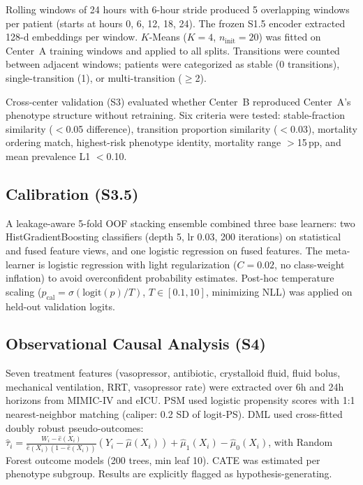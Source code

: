 \documentclass[conference,a4paper]{IEEEtran}
\begin{document}
Rolling windows of 24 hours with 6-hour stride produced 5 overlapping windows per patient (starts at hours 0, 6, 12, 18, 24). The frozen S1.5 encoder extracted 128-d embeddings per window. $K$-Means ($K{=}4$, $n_\text{init}{=}20$) was fitted on Center~A training windows and applied to all splits. Transitions were counted between adjacent windows; patients were categorized as stable (0 transitions), single-transition (1), or multi-transition ($\geq$2).

Cross-center validation (S3) evaluated whether Center~B reproduced Center~A's phenotype structure without retraining. Six criteria were tested: stable-fraction similarity ($<$0.05 difference), transition proportion similarity ($<$0.03), mortality ordering match, highest-risk phenotype identity, mortality range $>$15\,pp, and mean prevalence L1 $<$0.10.

\subsection{Calibration (S3.5)}

A leakage-aware 5-fold OOF stacking ensemble combined three base learners: two HistGradientBoosting classifiers (depth 5, lr 0.03, 200 iterations) on statistical and fused feature views, and one logistic regression on fused features. The meta-learner is logistic regression with light regularization ($C{=}0.02$, no class-weight inflation) to avoid overconfident probability estimates. Post-hoc temperature scaling ($p_\text{cal} = \sigma(\text{logit}(p)/T)$, $T \in [0.1, 10]$, minimizing NLL) was applied on held-out validation logits.

\subsection{Observational Causal Analysis (S4)}

Seven treatment features (vasopressor, antibiotic, crystalloid fluid, fluid bolus, mechanical ventilation, RRT, vasopressor rate) were extracted over 6h and 24h horizons from MIMIC-IV and eICU. PSM used logistic propensity scores with 1:1 nearest-neighbor matching (caliper: 0.2 SD of logit-PS). DML used cross-fitted doubly robust pseudo-outcomes: $\hat{\tau}_i = \frac{W_i - \hat{e}(X_i)}{\hat{e}(X_i)(1-\hat{e}(X_i))} (Y_i - \hat{\mu}(X_i)) + \hat{\mu}_1(X_i) - \hat{\mu}_0(X_i)$, with Random Forest outcome models (200 trees, min leaf 10). CATE was estimated per phenotype subgroup. Results are explicitly flagged as hypothesis-generating.
\end{document}
